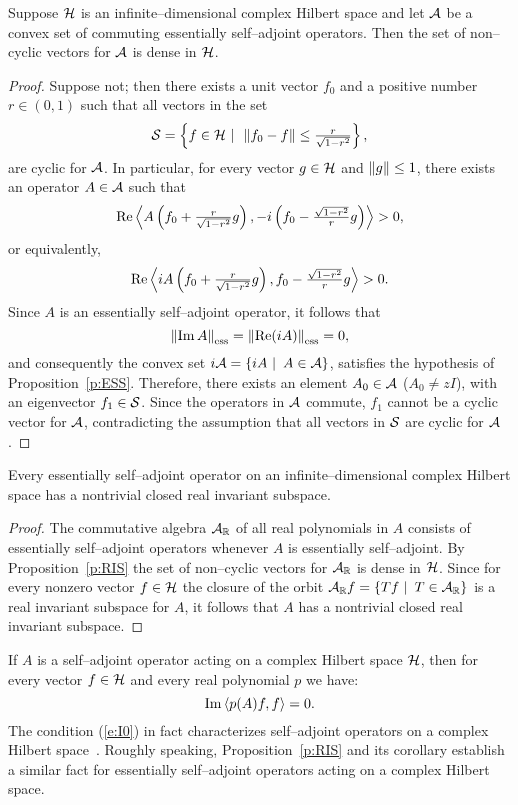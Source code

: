 \begin{prop}\label{p:RIS}
Suppose ${\cal H}$ is an infinite--dimensional complex Hilbert space
and let ${\cal A}$ be a convex set of commuting essentially
self--adjoint operators. Then the set of non--cyclic vectors
for ${\cal A}$ is dense in ${\cal H}$.
\end{prop}

\begin{proof}
Suppose not; then there exists a unit vector $f_0$ and a
positive number $r\in(0,1)$ such that all vectors in the set
\[  {\cal S}=\left\{f\in{\cal H}\,\,|\,\,\,\left\Vert f_0-f\right\Vert\leq\tfrac{r}{\sqrt{1-r^2}}\right\}, \]
are cyclic for ${\cal A}$. In particular, for every vector $g\in{\cal H}$
and $\left\Vert g\right\Vert\leq1$, there exists an operator $A\in{\cal A}$ such
that
\[ \operatorname{Re}\left<A\left(f_0+\tfrac{r}{\sqrt{1-r^2}}g\right),
          -i\left(f_0-\tfrac{\sqrt{1-r^2}}{r}g\right)\right> > 0, \]
or equivalently,
\[ \operatorname{Re}\left< i A\left(f_0+\tfrac{r}{\sqrt{1-r^2}}g\right),
                     f_0-\tfrac{\sqrt{1-r^2}}{r}g\right> > 0. \]
Since $A$ is an essentially self--adjoint operator, it follows
that
\[ \essnorm{\IM{A}}=\essnorm{\RE(i{A})}=0, \]
and consequently the convex set
$i{\cal A}=\left\{i{A}\,\,|\,\,\,A\in{\cal A}\right\}$, satisfies the hypothesis of
Proposition~\ref{p:ESS}. Therefore, there exists an element
$A_0\in{\cal A}$ ($A_0\neq{z}I$), with an eigenvector $f_1\in{\cal S}$.
Since the operators in ${\cal A}$ commute, $f_1$ cannot be a cyclic
vector for ${\cal A}$, contradicting the assumption that all vectors
in ${\cal S}$ are cyclic for ${\cal A}$.
\end{proof}

\begin{cor}[V.I.\,Lomonosov, 1992]
Every essentially self--adjoint operator on an
infinite--dimensional complex Hilbert space has a nontrivial
closed real invariant subspace.
\end{cor}

\begin{proof}
The commutative algebra ${\cal A}_{\mathbb R}$ of all real polynomials in
$A$ consists of essentially self--adjoint operators whenever
$A$ is essentially self--adjoint. By Proposition~\ref{p:RIS}
the set of non--cyclic vectors for ${\cal A}_{\mathbb R}$ is dense in
${\cal H}$. Since for every nonzero vector $f\in{\cal H}$ the closure of
the orbit ${\cal A}_{\mathbb R}f=\left\{T{f}\,\,|\,\,\,T\in{\cal A}_{\mathbb R}\right\}$ is
a real invariant subspace for $A$, it follows that $A$ has a
nontrivial closed real invariant subspace.
\end{proof}

\begin{rem}
If $A$ is a self--adjoint operator acting on a complex Hilbert
space ${\cal H}$, then for every vector $f\in{\cal H}$ and every real
polynomial $p$ we have:
\begin{equation} \label{e:I0}
  \operatorname{Im}\left<p(A){f},f\right>=0.
\end{equation}
The condition (\ref{e:I0}) in fact characterizes self--adjoint
operators on a complex Hilbert space~\cite[p.~103]{KR83}.
Roughly speaking, Proposition~\ref{p:RIS} and its corollary
establish a similar fact for essentially self--adjoint
operators acting on a complex Hilbert space.
\end{rem}

